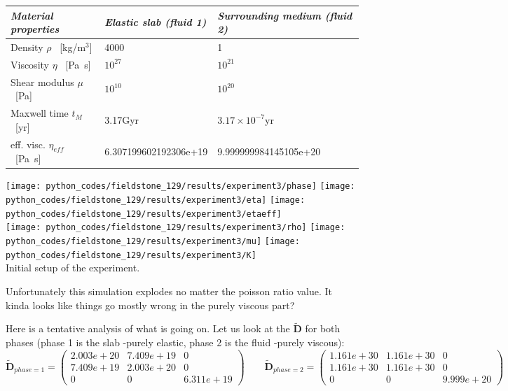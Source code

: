 \begin{center}
\begin{tabular}{lll}
\hline 
\textit{Material properties}& \textit{Elastic slab (fluid 1)}  & \textit{Surrounding medium (fluid 2)} \\
\hline 
\hline
Density         $\rho$ \  [kg/m$^{3}$]            & 4000                    & 1     \\
Viscosity       $\eta$ \  [\si{\pascal\second}]    & $10^{27}$               &   $10^{21}$     \\
Shear modulus   $\mu $ \  [\si{\pascal}]           & $10^{10}$               & $10^{20}$       \\
Maxwell time $t_M$     \  [yr]                     & 3.17Gyr                 &  $3.17\times10^{-7}$yr       \\
eff. visc.      $\eta_{eff}$ \ [\si{\pascal\second}] & 6.307199602192306e+19   &  9.999999984145105e+20      \\
\hline
\end{tabular}
\end{center}


\begin{center}
\texttt{[image: python\_codes/fieldstone\_129/results/experiment3/phase]}
\texttt{[image: python\_codes/fieldstone\_129/results/experiment3/eta]}
\texttt{[image: python\_codes/fieldstone\_129/results/experiment3/etaeff]}\\
\texttt{[image: python\_codes/fieldstone\_129/results/experiment3/rho]}
\texttt{[image: python\_codes/fieldstone\_129/results/experiment3/mu]}
\texttt{[image: python\_codes/fieldstone\_129/results/experiment3/K]}\\
{\captionfont Initial setup of the experiment.}
\end{center} 

Unfortunately this simulation explodes no matter the poisson ratio value.
It kinda looks like things go mostly wrong in the purely viscous part?

Here is a tentative analysis of what is going on. Let us look at the 
$\tilde{\bm D}$ for both phases (phase 1 is the slab -purely elastic, phase 2 is the fluid -purely viscous):
\[
\tilde{\bm D}_{phase=1} = 
\left(
\begin{array}{ccc}
2.003e+20 &7.409e+19 & 0 \\
7.409e+19  & 2.003e+20 & 0 \\
0 & 0 & 6.311e+19 
\end{array}
\right)
\qquad
\tilde{\bm D}_{phase=2} = 
\left(
\begin{array}{ccc}
1.161e+30 & 1.161e+30 & 0 \\
1.161e+30 & 1.161e+30 & 0 \\
0 & 0 & 9.999e+20
\end{array}
\right)
\]

